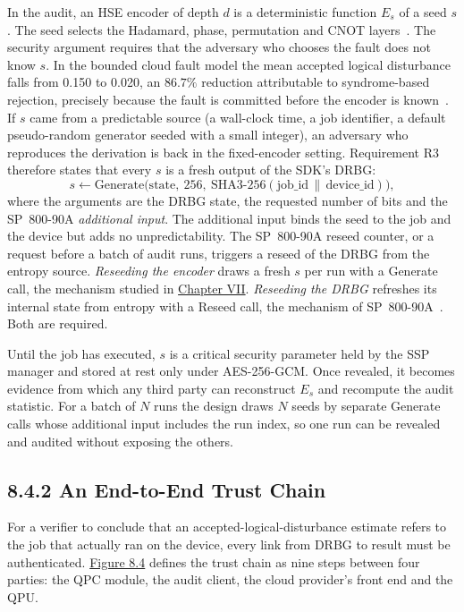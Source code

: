 \documentclass{report}
\theoremstyle{plain}
\theoremstyle{definition}
\theoremstyle{remark}
\begin{document}
In the audit, an HSE encoder of depth $d$ is a deterministic function $E_s$ of a seed $s$. The seed selects the Hadamard, phase, permutation and CNOT layers~\cite{guo2026qecaudit}. The security argument requires that the adversary who chooses the fault does not know $s$. In the bounded cloud fault model the mean accepted logical disturbance falls from 0.150 to 0.020, an $86.7\%$ reduction attributable to syndrome-based rejection, precisely because the fault is committed before the encoder is known~\cite{guo2026qecaudit}. If $s$ came from a predictable source (a wall-clock time, a job identifier, a default pseudo-random generator seeded with a small integer), an adversary who reproduces the derivation is back in the fixed-encoder setting. Requirement R3 therefore states that every $s$ is a fresh output of the SDK's DRBG:
\hypertarget{eq:pqc:seed}{}\[
s \leftarrow \mathrm{Generate}\bigl(\mathrm{state},\ 256,\ \mathrm{SHA3\text{-}256}(\mathrm{job\_id} \,\|\, \mathrm{device\_id})\bigr),
\tag{8.1}\]
where the arguments are the DRBG state, the requested number of bits and the SP~800-90A \emph{additional input}. The additional input binds the seed to the job and the device but adds no unpredictability. The SP~800-90A reseed counter, or a request before a batch of audit runs, triggers a reseed of the DRBG from the entropy source. \emph{Reseeding the encoder} draws a fresh $s$ per run with a Generate call, the mechanism studied in \hyperref[ch:qec]{Chapter VII}. \emph{Reseeding the DRBG} refreshes its internal state from entropy with a Reseed call, the mechanism of SP~800-90A~\cite{nist2015sp80090a}. Both are required.

Until the job has executed, $s$ is a critical security parameter held by the SSP manager and stored at rest only under AES-256-GCM. Once revealed, it becomes evidence from which any third party can reconstruct $E_s$ and recompute the audit statistic. For a batch of $N$ runs the design draws $N$ seeds by separate Generate calls whose additional input includes the run index, so one run can be revealed and audited without exposing the others.

\subsection{8.4.2 An End-to-End Trust Chain}\label{sec:pqc:trustchain}

For a verifier to conclude that an accepted-logical-disturbance estimate refers to the job that actually ran on the device, every link from DRBG to result must be authenticated. \hyperref[fig:pqc:trustchain]{Figure 8.4} defines the trust chain as nine steps between four parties: the QPC module, the audit client, the cloud provider's front end and the QPU.
\end{document}
